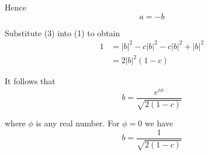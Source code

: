 Hence
\begin{equation*}
a=-b
\tag{3}
\end{equation*}

Substitute (3) into (1) to obtain
\begin{align*}
1&=|b|^2-c|b|^2-c|b|^2+|b|^2
\\
&=2|b|^2(1-c)
\end{align*}

It follows that
\begin{equation*}
b=\frac{e^{i\phi}}{\sqrt{2(1-c)}}
\end{equation*}

where $\phi$ is any real number.
For $\phi=0$ we have
\begin{equation*}
b=\frac{1}{\sqrt{2(1-c)}}
\end{equation*}


